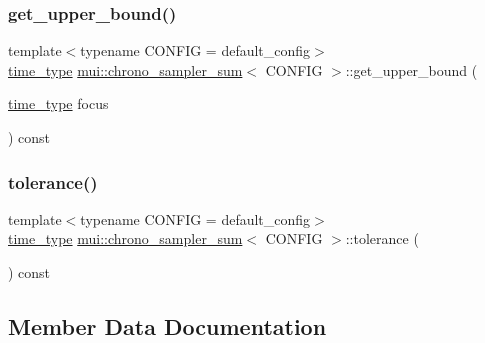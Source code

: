 \subsubsection{\texorpdfstring{get\+\_\+upper\+\_\+bound()}{get\_upper\_bound()}}
{\footnotesize\ttfamily template$<$typename C\+O\+N\+F\+IG  = default\+\_\+config$>$ \\
\hyperlink{classmui_1_1chrono__sampler__sum_ada1a39bc0845e79c00e7aed8b55e8fb2}{time\+\_\+type} \hyperlink{classmui_1_1chrono__sampler__sum}{mui\+::chrono\+\_\+sampler\+\_\+sum}$<$ C\+O\+N\+F\+IG $>$\+::get\+\_\+upper\+\_\+bound (\begin{DoxyParamCaption}\item[{\hyperlink{classmui_1_1chrono__sampler__sum_ada1a39bc0845e79c00e7aed8b55e8fb2}{time\+\_\+type}}]{focus }\end{DoxyParamCaption}) const\hspace{0.3cm}{\ttfamily [inline]}}

\mbox{\label{classmui_1_1chrono__sampler__sum_a7a71a456a96f161fa91104f8e4696b99}} 
\subsubsection{\texorpdfstring{tolerance()}{tolerance()}}
{\footnotesize\ttfamily template$<$typename C\+O\+N\+F\+IG  = default\+\_\+config$>$ \\
\hyperlink{classmui_1_1chrono__sampler__sum_ada1a39bc0845e79c00e7aed8b55e8fb2}{time\+\_\+type} \hyperlink{classmui_1_1chrono__sampler__sum}{mui\+::chrono\+\_\+sampler\+\_\+sum}$<$ C\+O\+N\+F\+IG $>$\+::tolerance (\begin{DoxyParamCaption}{ }\end{DoxyParamCaption}) const\hspace{0.3cm}{\ttfamily [inline]}}



\subsection{Member Data Documentation}
\mbox{\label{classmui_1_1chrono__sampler__sum_a4c7a8436e5562dca7d9851356817d7b6}} 
